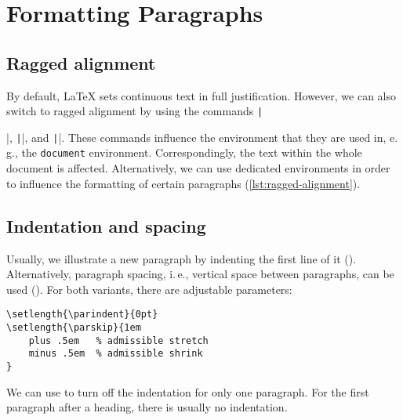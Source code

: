\chapter{Formatting Paragraphs} %
\label{sec:formatting-paragraphs}

\section*{Ragged alignment}
\label{sec:ragged-alignment}
By default, \LaTeX{} sets continuous text in full justification. 
However, we can also switch to ragged alignment by using the commands 
\texttt|\raggedright|, \texttt|\raggedleft|, and 
\texttt|\centering|. 
These commands influence the environment that they are used in, e.\,g., the 
\texttt{document} environment. Correspondingly, the text within the whole 
document is affected. 
Alternatively, we can use dedicated environments in order to influence the 
formatting
of certain paragraphs (\cref{lst:ragged-alignment}).


\section*{Indentation and spacing}
\label{sec:indents-and-parskips}
Usually, we illustrate a new paragraph by indenting the first line of it 
(\texttt{\parindent}). 
Alternatively, paragraph spacing, i.\,e., vertical space between paragraphs, 
can be used (\texttt{\parskip}).
For both variants, there are adjustable parameters:
\begin{verbatim}
\setlength{\parindent}{0pt}
\setlength{\parskip}{1em
    plus .5em   % admissible stretch
    minus .5em  % admissible shrink
}
\end{verbatim}

\noindent We can use \texttt{\noindent} to turn off the indentation for only one 
paragraph. 
For the first paragraph after a heading, there is usually no indentation. 

